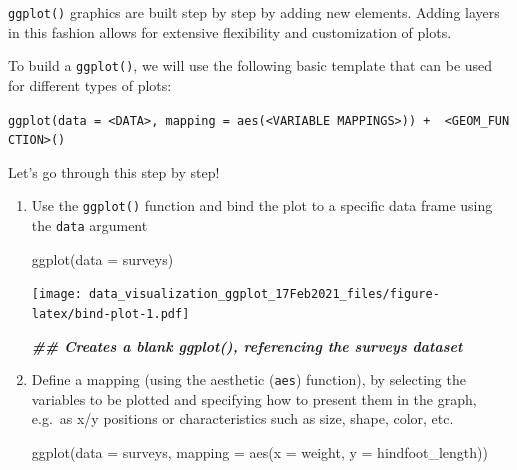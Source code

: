 \documentclass[
]{article}
\newenvironment{Shaded}{\begin{snugshade}}{\end{snugshade}}
\newcommand{\AttributeTok}[1]{\textcolor[rgb]{0.77,0.63,0.00}{#1}}
\newcommand{\DocumentationTok}[1]{\textcolor[rgb]{0.56,0.35,0.01}{\textbf{\textit{#1}}}}
\newcommand{\FunctionTok}[1]{\textcolor[rgb]{0.00,0.00,0.00}{#1}}
\newcommand{\NormalTok}[1]{#1}
\begin{document}
\texttt{ggplot()} graphics are built step by step by adding new
elements. Adding layers in this fashion allows for extensive flexibility
and customization of plots.

To build a \texttt{ggplot()}, we will use the following basic template
that can be used for different types of plots:

\texttt{ggplot(data\ =\ \textless{}DATA\textgreater{},\ mapping\ =\ aes(\textless{}VARIABLE\ MAPPINGS\textgreater{}))\ +\ \ \textless{}GEOM\_FUNCTION\textgreater{}()}

\newpage

Let's go through this step by step!

\begin{enumerate}
\def\labelenumi{\arabic{enumi}.}
\item
  Use the \texttt{ggplot()} function and bind the plot to a specific
  data frame using the \texttt{data} argument

\begin{Shaded}
\begin{Highlighting}[]
\FunctionTok{ggplot}\NormalTok{(}\AttributeTok{data =}\NormalTok{ surveys)}
\end{Highlighting}
\end{Shaded}

  \texttt{[image: data\_visualization\_ggplot\_17Feb2021\_files/figure-latex/bind-plot-1.pdf]}

\begin{Shaded}
\begin{Highlighting}[]
\DocumentationTok{\#\# Creates a blank ggplot(), referencing the surveys dataset}
\end{Highlighting}
\end{Shaded}
\item
  Define a mapping (using the aesthetic (\texttt{aes}) function), by
  selecting the variables to be plotted and specifying how to present
  them in the graph, e.g.~as x/y positions or characteristics such as
  size, shape, color, etc.

\begin{Shaded}
\begin{Highlighting}[]
\FunctionTok{ggplot}\NormalTok{(}\AttributeTok{data =}\NormalTok{ surveys, }
       \AttributeTok{mapping =} \FunctionTok{aes}\NormalTok{(}\AttributeTok{x =}\NormalTok{ weight, }\AttributeTok{y =}\NormalTok{ hindfoot\_length))}
\end{Highlighting}
\end{Shaded}


\end{enumerate}
\end{document}
